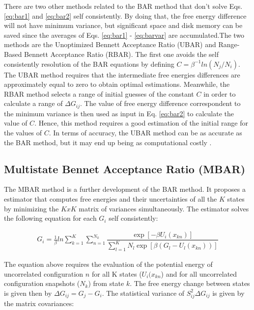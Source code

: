 There are two other methods related to the BAR method that don't solve Eqs. \eqref{eq:bar1} and \eqref{eq:bar2} self consistently. By doing that, the free energy difference will not have minimum variance, but significant space and disk memory can be saved since the averages of Eqs. \eqref{eq:bar1} - \eqref{eq:barvar} are accumulated.The two methods are the Unoptimized Bennett Acceptance Ratio (UBAR) and Range-Based Bennett Acceptance Ratio (RBAR). The first one avoids the self consistently resolution of the BAR equations by defining $C=\beta^{-1}ln(N_{j}/N_{i})$. The UBAR method requires that the intermediate free energies differences are approximately equal to zero to obtain optimal estimations. Meanwhile, the RBAR method selects a range of initial guesses of the constant $C$ in order to calculate a range  of $\Delta G_{ij}$. The value of free energy difference correspondent to the minimum variance is then used as input in Eq. \eqref{eq:bar2} to calculate the value of $C$. Hence, this method requires a good estimation of the initial range for the values of $C$. In terms of accuracy, the UBAR method can be as accurate as the BAR method, but it may end up being as computational costly \cite{bareva}.  

\subsection{Multistate Bennet Acceptance Ratio (MBAR)}\label{mbar}

The MBAR method \cite{mbar} is a further development of the BAR method. It proposes a estimator that computes free energies and their uncertainties of all the $K$ states  by minimizing the $KxK$ matrix of variances simultaneously. The estimator solves the following equation for each $G_{i}$ self consistently:

\begin{equation}
\label{eq:mbar}
\begin{aligned}
G_{i} = \frac{1}{\beta}ln \sum_{k=1}^{K} \sum_{n=1}^{N_{k}}
\dfrac{\exp[-\beta U_{i}(x_{kn})]}{\sum_{l=1}^{K} N_{l} \exp[\beta (G_{l} - U_{l}(x_{kn}))]}
\end{aligned}
\end{equation}

The equation above requires the evaluation of the potential energy  of uncorrelated configuration $n$ for all K states ($U_{i}(x_{kn}$) and for all uncorrelated configuration snapshots ($N_{k}$) from state $k$. The free energy change between states is given then by $\Delta G_{ij} = G_{j} -  G_{i}$. The statistical variance of $S_{ij}^{2} \Delta G_{ij}$ is given by the matrix covariances:

